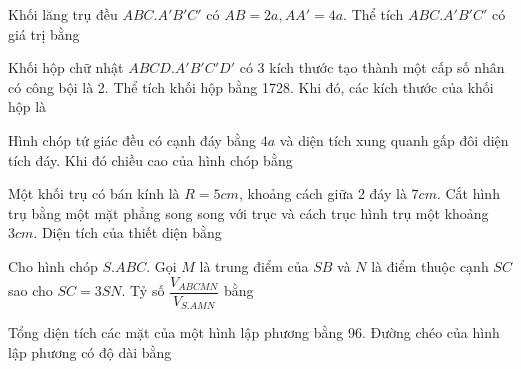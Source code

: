 \documentclass[12pt]{article}
\begin{document}
\begin{vnmultiplechoice}[keycolumns=3]
\begin{question}%
Khối lăng trụ đều $ABC.A'B'C'$ có $AB=2a, AA'=4a$. Thể tích $ABC.A'B'C'$ có giá trị bằng
\vspace{0.2cm}
\datcot
\bonpa
{}
{}
{}
{}
\end{question}

\begin{question} %
Khối hộp chữ nhật $ABCD.A'B'C'D'$ có 3 kích thước tạo thành một cấp số nhân có công bội là 2. Thể tích khối hộp bằng 1728. Khi đó, các kích thước của khối hộp là
\vspace{0.2cm}
\datcot
\bonpa
{}
{}
{}
{}
\end{question}

\begin{question}%
Hình chóp tứ giác đều có cạnh đáy bằng $4a$ và diện tích xung quanh gấp đôi diện tích đáy. Khi đó chiều cao của hình chóp bằng
\vspace{0.2cm}
\datcot
\bonpa
{}
{}
{}
{}
\end{question}

\begin{question}%
Một khối trụ có bán kính là $R=5cm$, khoảng cách giữa 2 đáy là $7cm$. Cắt hình trụ bằng một mặt phẳng song song với trục và cách trục hình trụ một khoảng $3cm$. Diện tích của thiết diện bằng
\vspace{0.2cm}
\datcot
\bonpa
{}
{}
{}
{}
\end{question}

\begin{question}%
Cho hình chóp $S.ABC$. Gọi $M$ là trung điểm của $SB$ và $N$ là điểm thuộc cạnh $SC$ sao cho $SC=3SN$. Tỷ số $\dfrac{V_{ABCMN}}{V_{S.AMN}}$ bằng
\vspace{0.2cm}
\datcot
\bonpa
{}
{}
{}
{}
\end{question}

\begin{question}%
Tổng diện tích các mặt của một hình lập phương bằng 96. Đường chéo của hình lập phương có độ dài bằng
\vspace{0.2cm}
\datcot
\bonpa
{}
{}
{}
{}
\end{question}


\end{vnmultiplechoice}
\end{document}
